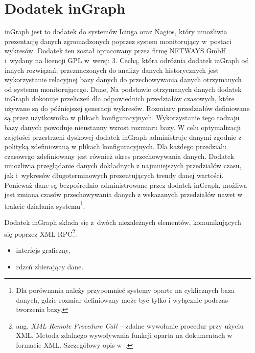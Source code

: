 \section[Dodatek inGraph][Dodatek inGraph]{Dodatek inGraph}
\label{sec:inGraph}

inGraph jest to dodatek do systemów Icinga oraz Nagios, który
umożliwia prezentację danych zgromadzonych poprzez system monitorujący
w~postaci wykresów. Dodatek ten został opracowany przez firmę NETWAYS
GmbH i~wydany na licencji GPL w~wersji 3. Cechą, która odróżnia
dodatek inGraph od innych rozwiązań, przeznaczonych do analizy danych
historycznych jest wykorzystanie relacyjnej bazy danych do
przechowywania danych otrzymanych od systemu monitorującego. Dane, Na
podstawie otrzymanych danych dodatek inGraph dokonuje przeliczeń dla
odpowiednich przedziałów czasowych, które używane są do późniejszej
generacji wykresów. Rozmiary przedziałów definiowane są przez
użytkownika w plikach konfiguracyjnych. Wykorzystanie tego rodzaju
bazy danych powoduje nieustanny wzrost rozmiaru bazy. W celu
optymalizacji zajętości przestrzeni dyskowej dodatek inGraph
administruje danymi zgodnie z polityką zdefiniowaną w plikach
konfiguracyjnych. Dla każdego przedziału czasowego zdefiniowany jest
również okres przechowywania danych. Dodatek umożliwia przeglądanie
danych dokładnych z najmniejszych przedziałów czasu, jak i~wykresów
długoterminowych prezentujących trendy danej wartości. Ponieważ dane
są bezpośrednio administrowane przez dodatek inGraph, możliwa jest
zmiana czasów przechowywania danych z wskazanych przedziałów nawet w
trakcie działania systemu\footnote{Dla porównania należy przypomnieć
  systemy oparte na cyklicznych baza danych, gdzie rozmiar definiowany
  może być tylko i wyłącznie podczas tworzenia bazy.}.

Dodatek inGraph składa się z~dwóch niezależnych elementów,
komunikujących się poprzez XML-RPC\footnote{ang. {\em XML Remote
    Procedure Call} -- zdalne wywołanie procedur przy użyciu
  XML. Metoda zdalnego wywoływania funkcji oparta na dokumentach w
  formacie XML. Szczegółowy opis w~\cite{www:XMLRPC}.}:

\begin{itemize}
\item interfejs graficzny,
\item rdzeń zbierający dane.
\end{itemize}

